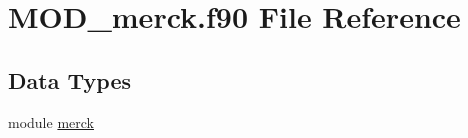 \hypertarget{MOD__merck_8f90}{\section{M\-O\-D\-\_\-merck.\-f90 File Reference}
\label{MOD__merck_8f90}
}
\subsection*{Data Types}
\begin{DoxyCompactItemize}
\item 
module \hyperlink{classmerck}{merck}
\end{DoxyCompactItemize}

